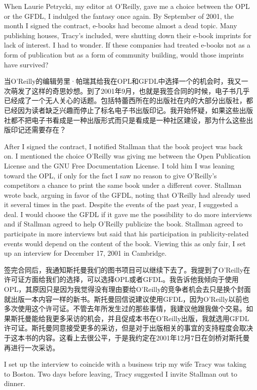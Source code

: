 \ifdefined\eng
When Laurie Petrycki, my editor at O'Reilly, gave me a choice between the OPL or the GFDL, I indulged the fantasy once again. By September of 2001, the month I signed the contract, e-books had become almost a dead topic. Many publishing houses, Tracy's included, were shutting down their e-book imprints for lack of interest. I had to wonder. If these companies had treated e-books not as a form of publication but as a form of community building, would those imprints have survived?
\fi

\ifdefined\chs
当O'Reilly的编辑劳里·帕瑞其给我在OPL和GFDL中选择一个的机会时，我又一次萌发了这样的奇思妙想。到了2001年9月，也就是我签合同的时候，电子书几乎已经成了一个无人关心的话题。包括特蕾西所在的出版社在内的大部分出版社，都已经因为读者缺乏兴趣而停止了标名电子书出版印记。我开始怀疑，如果这些出版社都不把电子书看成是一种出版形式而只是看成是一种社区建设，那为什么这些出版印记还需要存在？
\fi

\ifdefined\eng
After I signed the contract, I notified Stallman that the book project was back on. I mentioned the choice O'Reilly was giving me between the Open Publication License and the GNU Free Documentation License. I told him I was leaning toward the OPL, if only for the fact I saw no reason to give O'Reilly's competitors a chance to print the same book under a different cover. Stallman wrote back, arguing in favor of the GFDL, noting that O'Reilly had already used it several times in the past. Despite the events of the past year, I suggested a deal. I would choose the GFDL if it gave me the possibility to do more interviews and if Stallman agreed to help O'Reilly publicize the book. Stallman agreed to participate in more interviews but said that his participation in publicity-related events would depend on the content of the book. Viewing this as only fair, I set up an interview for December 17, 2001 in Cambridge.
\fi

\ifdefined\chs
签完合同后，我通知斯托曼我们的图书项目可以继续下去了。我提到了O'Reilly在许可证方面给我们的选择，可以选择OPL或者GFDL。我告诉他我倾向于使用OPL，其原因只是因为我觉得没有理由要给O'Reilly的竞争者机会去只是换个封面就出版一本内容一样的新书。斯托曼回信说建议使用GFDL，因为O'Reilly以前也多次使用这个许可证。不管去年所发生过的那些事情，我建议他跟我做个交易。如果斯托曼能给我更多采访的机会，并且促成本书在O'Reilly出版，我就选用GFDL许可证。斯托曼同意接受更多的采访，但是对于出版相关的事宜的支持程度会取决于这本书的内容。这看上去很公平，于是我约定在2001年12月7日在剑桥对斯托曼再进行一次采访。
\fi

\ifdefined\eng
I set up the interview to coincide with a business trip my wife Tracy was taking to Boston. Two days before leaving, Tracy suggested I invite Stallman out to dinner.
\fi

